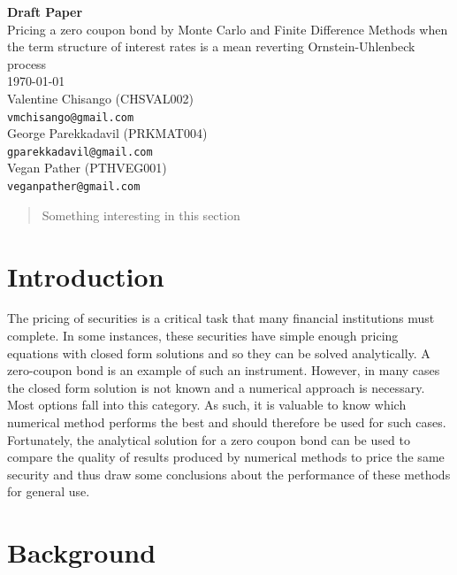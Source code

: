\documentclass[12pt,a4paper]{article}
\begin{document}
\begin{titlepage}
	
	\begin{center}
		\textbf{{\Large Draft Paper}}\\
		\vspace{1cm}
		{\Large Pricing a zero coupon bond by Monte Carlo and Finite Difference Methods when the term structure of interest rates is a mean reverting Ornstein-Uhlenbeck process}\\
		\vspace{1cm}
		\today\\
		Valentine Chisango (CHSVAL002)\\
		{\tt vmchisango@gmail.com}\\ 
		
		George Parekkadavil (PRKMAT004)\\
		{\tt gparekkadavil@gmail.com}\\
		
		Vegan Pather (PTHVEG001)\\
		\tt {veganpather@gmail.com}
		
	\end{center}

\begin{abstract}
	Something interesting in this section
\end{abstract}	

\end{titlepage}
\newpage

\section{Introduction}
The pricing of securities is a critical task that many financial institutions must complete. In some instances, these securities have simple enough pricing equations with closed form solutions and so they can be solved analytically. A zero-coupon bond is an example of such an instrument. However, in many cases the closed form solution is not known and a numerical approach is necessary. Most options fall into this category. As such, it is valuable to know which numerical method performs the best and should therefore be used for such cases. Fortunately, the analytical solution for a zero coupon bond can be used to compare the quality of results produced by numerical methods to price the same security and thus draw some conclusions about the performance of these methods for general use. 
\label{sec: Intro}

\newpage
\section{Background}
\label{sec: Backgrd}
\end{document}
